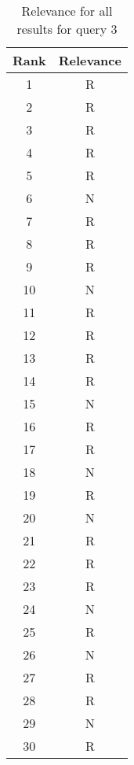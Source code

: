 \begin{table}[H]
    \centering
    \begin{tabular}{|c|c|}
    \hline
    \rowcolor[gray]{0.9} Rank & Relevance \\ \hline
    1 & R \\ \hline
2 & R \\ \hline
3 & R \\ \hline
4 & R \\ \hline
5 & R \\ \hline
6 & N \\ \hline
7 & R \\ \hline
8 & R \\ \hline
9 & R \\ \hline
10 & N \\ \hline
11 & R \\ \hline
12 & R \\ \hline
13 & R \\ \hline
14 & R \\ \hline
15 & N \\ \hline
16 & R \\ \hline
17 & R \\ \hline
18 & N \\ \hline
19 & R \\ \hline
20 & N \\ \hline
21 & R \\ \hline
22 & R \\ \hline
23 & R \\ \hline
24 & N \\ \hline
25 & R \\ \hline
26 & N \\ \hline
27 & R \\ \hline
28 & R \\ \hline
29 & N \\ \hline
30 & R \\ \hline

    \end{tabular}
    \caption{Relevance for all results for query 3}
    \label{tab:query3_results}
\end{table}
    


